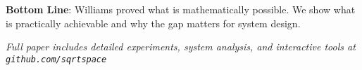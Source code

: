 \documentclass[11pt,twocolumn]{article}
\begin{document}
\vspace{3mm}
\noindent\textbf{Bottom Line}: Williams proved what is mathematically possible. We show what is practically achievable and why the gap matters for system design.

\vspace{3mm}
\noindent\textit{Full paper includes detailed experiments, system analysis, and interactive tools at \texttt{github.com/sqrtspace}}
\end{document}
